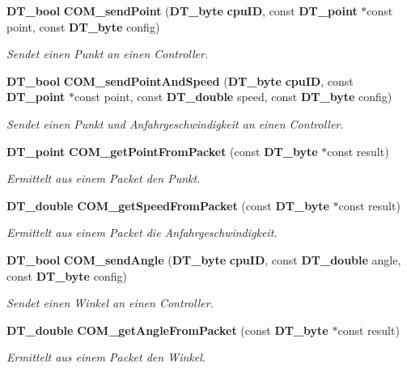 \begin{DoxyCompactItemize}
{\bf DT\_\-bool} {\bf COM\_\-sendPoint} ({\bf DT\_\-byte} {\bf cpuID}, const {\bf DT\_\-point} $\ast$const point, const {\bf DT\_\-byte} config)
\begin{DoxyCompactList}\small\item\em Sendet einen Punkt an einen Controller. \item\end{DoxyCompactList}\item 
{\bf DT\_\-bool} {\bf COM\_\-sendPointAndSpeed} ({\bf DT\_\-byte} {\bf cpuID}, const {\bf DT\_\-point} $\ast$const point, const {\bf DT\_\-double} speed, const {\bf DT\_\-byte} config)
\begin{DoxyCompactList}\small\item\em Sendet einen Punkt und Anfahrgeschwindigkeit an einen Controller. \item\end{DoxyCompactList}\item 
{\bf DT\_\-point} {\bf COM\_\-getPointFromPacket} (const {\bf DT\_\-byte} $\ast$const result)
\begin{DoxyCompactList}\small\item\em Ermittelt aus einem Packet den Punkt. \item\end{DoxyCompactList}\item 
{\bf DT\_\-double} {\bf COM\_\-getSpeedFromPacket} (const {\bf DT\_\-byte} $\ast$const result)
\begin{DoxyCompactList}\small\item\em Ermittelt aus einem Packet die Anfahrgeschwindigkeit. \item\end{DoxyCompactList}\item 
{\bf DT\_\-bool} {\bf COM\_\-sendAngle} ({\bf DT\_\-byte} {\bf cpuID}, const {\bf DT\_\-double} angle, const {\bf DT\_\-byte} config)
\begin{DoxyCompactList}\small\item\em Sendet einen Winkel an einen Controller. \item\end{DoxyCompactList}\item 
{\bf DT\_\-double} {\bf COM\_\-getAngleFromPacket} (const {\bf DT\_\-byte} $\ast$const result)
\begin{DoxyCompactList}\small\item\em Ermittelt aus einem Packet den Winkel. \item\end{DoxyCompactList}\item 

\end{DoxyCompactItemize}
